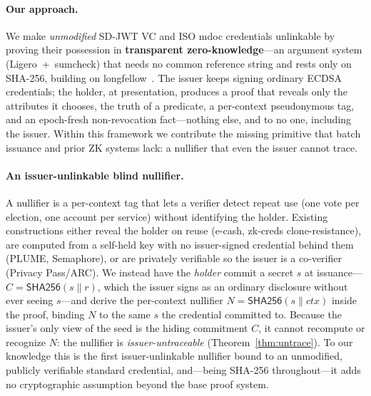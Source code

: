 \documentclass[11pt]{article}
\theoremstyle{plain}
\theoremstyle{definition}
\begin{document}
\paragraph{Our approach.}
We make \emph{unmodified} SD-JWT VC and ISO mdoc credentials unlinkable by proving
their possession in \textbf{transparent zero-knowledge}---an argument system
(Ligero~+~sumcheck) that needs no common reference string and rests only on SHA-256,
building on longfellow~\cite{frigo2024longfellow}. The issuer keeps signing ordinary
ECDSA credentials; the holder, at presentation, produces a proof that reveals only
the attributes it chooses, the truth of a predicate, a per-context pseudonymous tag,
and an epoch-fresh non-revocation fact---nothing else, and to no one, including the
issuer. Within this framework we contribute the missing primitive that batch
issuance and prior ZK systems lack: a nullifier that even the issuer cannot trace.

\paragraph{An issuer-unlinkable blind nullifier.}
A nullifier is a per-context tag that lets a verifier detect repeat use (one vote per
election, one account per service) without identifying the holder. Existing
constructions either reveal the holder on reuse (e-cash, zk-creds clone-resistance),
are computed from a self-held key with no issuer-signed credential behind them (PLUME,
Semaphore), or are privately verifiable so the issuer is a co-verifier (Privacy
Pass/ARC). We instead have the \emph{holder} commit a secret $s$ at
issuance---$C=\mathsf{SHA256}(s\|r)$, which the issuer signs as an ordinary disclosure
without ever seeing $s$---and derive the per-context nullifier
$N=\mathsf{SHA256}(s\|\mathit{ctx})$ inside the proof, binding $N$ to the same $s$ the
credential committed to. Because the issuer's only view of the seed is the hiding
commitment $C$, it cannot recompute or recognize $N$: the nullifier is
\emph{issuer-untraceable} (Theorem~\ref{thm:untrace}). To our knowledge this is the
first issuer-unlinkable nullifier bound to an unmodified, publicly verifiable standard
credential, and---being SHA-256 throughout---it adds no cryptographic assumption
beyond the base proof system.
\end{document}
